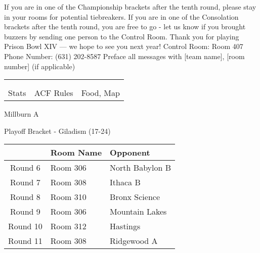 \documentclass{article}%
\begin{document}
\vspace*{30pt}%
\linebreak%
If you are in one of the Championship brackets after the tenth round, please stay in your rooms for potential tiebreakers.\newline%
\newline%
If you are in one of the Consolation brackets after the tenth round, you are free to go {-} let us know if you brought buzzers by sending one person to the Control Room.\newline%
\newline%
Thank you for playing Prison Bowl XIV — we hope to see you next year!\newline%
\newline%
Control Room: Room 407\newline%
Phone Number: (631) 202{-}8587\newline%
Preface all messages with {[}team name{]}, {[}room number{]} (if applicable)%
\vspace*{30pt}%
\newline%
%
\begin{tabularx}{\textwidth}{YYY}%
  &  &  \\%
\\%
Stats&ACF Rules&Food, Map\\%
\end{tabularx}%
\newpage%
\begin{center}%
\begin{Huge}%
Millburn A%
\end{Huge}%
\vspace*{12pt}%
\linebreak%
\begin{Large}%
Playoff Bracket {-} Giladism (17{-}24)%
\end{Large}%
\end{center}%
\vspace*{4pt}%
%
\begin{tabularx}{\textwidth}{|c|Y|Y|}%
\hline%
&Room Name&Opponent\\%
\hline%
Round 6&Room 306&North Babylon B\\%
Round 7&Room 308&Ithaca B\\%
Round 8&Room 310&Bronx Science\\%
Round 9&Room 306&Mountain Lakes\\%
Round 10&Room 312&Hastings\\%
Round 11&Room 308&Ridgewood A\\%
\hline%
\end{tabularx}%
\end{document}
